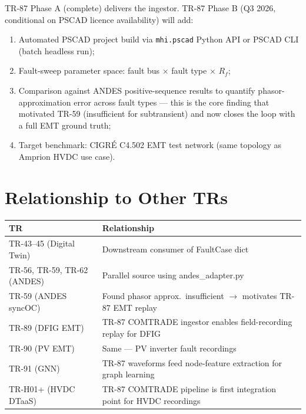 \documentclass[11pt,a4paper]{article}
\begin{document}
TR-87 Phase A (complete) delivers the ingestor.
TR-87 Phase B (Q3 2026, conditional on PSCAD licence availability) will add:

\begin{enumerate}
  \item Automated PSCAD project build via \texttt{mhi.pscad} Python API
        or PSCAD CLI (batch headless run);
  \item Fault-sweep parameter space: fault bus $\times$ fault type $\times$ $R_f$;
  \item Comparison against ANDES positive-sequence results to quantify
        phasor-approximation error across fault types — this is the core
        finding that motivated TR-59 (insufficient for subtransient) and
        now closes the loop with a full EMT ground truth;
  \item Target benchmark: CIGRÉ C4.502 EMT test network
        (same topology as Amprion HVDC use case).
\end{enumerate}

\section{Relationship to Other TRs}
\label{sec:related}

\begin{center}
\begin{tabular}{ll}
\toprule
TR & Relationship \\
\midrule
TR-43–45 (Digital Twin) & Downstream consumer of FaultCase dict \\
TR-56, TR-59, TR-62 (ANDES) & Parallel source using andes\_adapter.py \\
TR-59 (ANDES syncOC) & Found phasor approx.\ insufficient $\to$ motivates TR-87 EMT replay \\
TR-89 (DFIG EMT) & TR-87 COMTRADE ingestor enables field-recording replay for DFIG \\
TR-90 (PV EMT) & Same — PV inverter fault recordings \\
TR-91 (GNN) & TR-87 waveforms feed node-feature extraction for graph learning \\
TR-H01+ (HVDC DTaaS) & TR-87 COMTRADE pipeline is first integration point for HVDC recordings \\
\bottomrule
\end{tabular}
\end{center}

\end{document}
